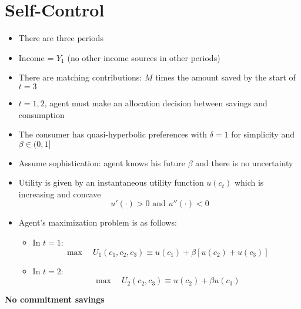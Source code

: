 \documentclass[a4paper]{article}
\begin{document}
\section{Self-Control}
\begin{itemize}
    \item There are three periods
    \item Income = $Y_1$ (no other income sources in other periods)
    \item There are matching contributions: $M$ times the amount saved by the start of $t=3$
    \item $t=1, 2$, agent must make an allocation decision between savings and consumption
    \item The consumer has quasi-hyperbolic preferences with $\delta=1$ for simplicity and $\beta\in(0,1]$
    \item Assume sophistication: agent knows his future $\beta$ and there is no uncertainty
    \item Utility is given by an instantaneous utility function $u(c_t)$ which is increasing and concave
    \[u'(\cdot)>0 \textrm{ and } u''(\cdot)<0 \]
    \item Agent's maximization problem is as follows:
    \begin{itemize}
        \item In $t=1$:
        \[\max\quad U_1(c_1,c_2,c_3)\equiv u(c_1)+\beta[u(c_2)+u(c_3) ] \]
        \item In $t=2$:
        \[\max\quad U_2(c_2,c_3)\equiv u(c_2)+\beta u(c_3) \]
    \end{itemize}
\end{itemize}
\textbf{No commitment savings}
\end{document}
